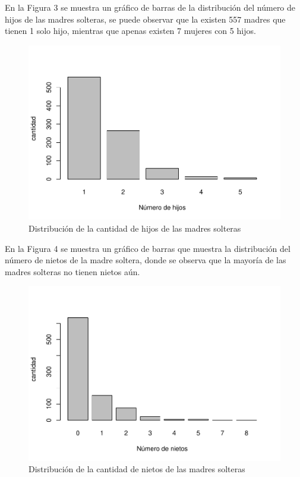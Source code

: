 \documentclass[11pt,twoside]{article}
\begin{document}
\vspace{180px}
\noindent
En la Figura 3 se muestra un gráfico de barras de la distribución del número de hijos de las madres solteras, se puede observar que la existen 557 madres que tienen 1 solo hijo, mientras que apenas existen 7 mujeres con 5 hijos.  
\begin{figure}[H]
	\centering
	\includegraphics{barrasnumerodehijos.pdf}
	\caption{Distribución de la cantidad de hijos de las madres solteras}
\end{figure}

\vspace{180px}
\noindent
En la Figura 4 se muestra un gráfico de barras que muestra la distribución del número de nietos de la madre soltera, donde se observa que la mayoría de las madres solteras no tienen nietos aún.
\begin{figure}[H]
	\centering
	\includegraphics{barrasnumerodenietos1.pdf}
	\caption{Distribución de la cantidad de nietos de las madres solteras}
\end{figure}
\end{document}
